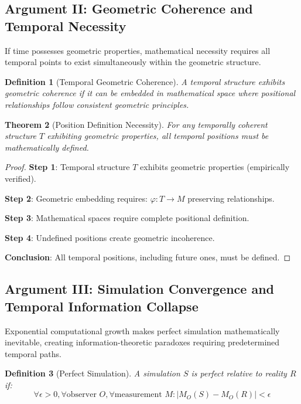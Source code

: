 \documentclass[11pt]{article}
\newtheorem{theorem}{Theorem}[section]
\newtheorem{definition}[theorem]{Definition}
\theoremstyle{remark}
\begin{document}
\subsection{Argument II: Geometric Coherence and Temporal Necessity}

If time possesses geometric properties, mathematical necessity requires all temporal points to exist simultaneously within the geometric structure.

\begin{definition}[Temporal Geometric Coherence]
A temporal structure exhibits geometric coherence if it can be embedded in mathematical space where positional relationships follow consistent geometric principles.
\end{definition}

\begin{theorem}[Position Definition Necessity]
For any temporally coherent structure $T$ exhibiting geometric properties, all temporal positions must be mathematically defined.
\end{theorem}

\begin{proof}
\textbf{Step 1}: Temporal structure $T$ exhibits geometric properties (empirically verified).

\textbf{Step 2}: Geometric embedding requires: $\varphi: T \to M$ preserving relationships.

\textbf{Step 3}: Mathematical spaces require complete positional definition.

\textbf{Step 4}: Undefined positions create geometric incoherence.

\textbf{Conclusion}: All temporal positions, including future ones, must be defined.
\end{proof}

\subsection{Argument III: Simulation Convergence and Temporal Information Collapse}

Exponential computational growth makes perfect simulation mathematically inevitable, creating information-theoretic paradoxes requiring predetermined temporal paths.

\begin{definition}[Perfect Simulation]
A simulation $S$ is perfect relative to reality $R$ if:
$$\forall \epsilon > 0, \forall \text{observer } O, \forall \text{measurement } M: |M_O(S) - M_O(R)| < \epsilon$$
\end{definition}
\end{document}
